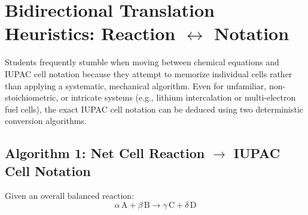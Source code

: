 \documentclass[10pt,a4paper]{article}
\begin{document}
\newpage
\section{Bidirectional Translation Heuristics: Reaction $\longleftrightarrow$ Notation}

Students frequently stumble when moving between chemical equations and IUPAC cell notation because they attempt to memorize individual cells rather than applying a systematic, mechanical algorithm. Even for unfamiliar, non-stoichiometric, or intricate systems (e.g., lithium intercalation or multi-electron fuel cells), the exact IUPAC cell notation can be deduced using two deterministic conversion algorithms.

\subsection{Algorithm 1: Net Cell Reaction $\longrightarrow$ IUPAC Cell Notation}

Given an overall balanced reaction:
\begin{equation*}
    \alpha\,\text{A} + \beta\,\text{B} \longrightarrow \gamma\,\text{C} + \delta\,\text{D}
\end{equation*}
\end{document}
